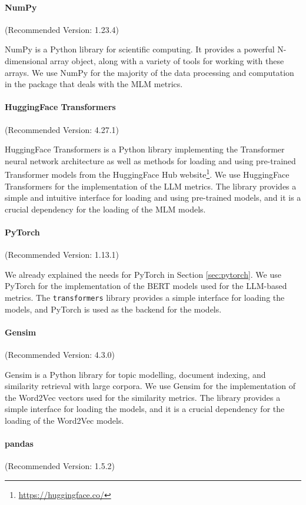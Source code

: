 \paragraph{NumPy} (Recommended Version: 1.23.4)

NumPy is a Python library for scientific computing. It provides a powerful N-dimensional array object, along with a variety of tools for working with these arrays. We use NumPy for the majority of the data processing and computation in the package that deals with the MLM metrics. 

\paragraph{HuggingFace Transformers} (Recommended Version: 4.27.1)

HuggingFace Transformers is a Python library implementing the Transformer neural network architecture as well as methods for loading and using pre-trained Transformer models from the HuggingFace Hub website\footnote{\url{https://huggingface.co/}}. We use HuggingFace Transformers for the implementation of the LLM metrics. The library provides a simple and intuitive interface for loading and using pre-trained models, and it is a crucial dependency for the loading of the MLM models.

\paragraph{PyTorch} (Recommended Version: 1.13.1)

We already explained the needs for PyTorch in Section \ref{sec:pytorch}. We use PyTorch for the implementation of the BERT models used for the LLM-based metrics. The \texttt{transformers} library provides a simple interface for loading the models, and PyTorch is used as the backend for the models.

\paragraph{Gensim} (Recommended Version: 4.3.0)

Gensim is a Python library for topic modelling, document indexing, and similarity retrieval with large corpora. We use Gensim for the implementation of the Word2Vec vectors used for the similarity metrics. The library provides a simple interface for loading the models, and it is a crucial dependency for the loading of the Word2Vec models.

\paragraph{pandas} (Recommended Version: 1.5.2)

